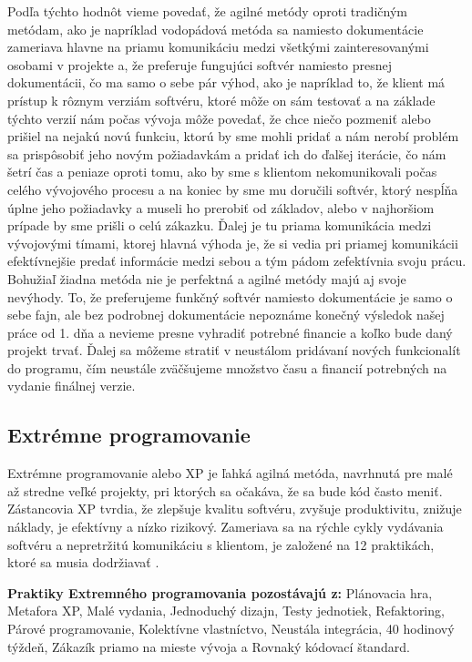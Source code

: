 \documentclass[10pt,oneside,slovak,a4paper]{article}
\begin{document}
Podľa týchto hodnôt vieme povedať, že agilné metódy oproti tradičným metódam, ako je napríklad vodopádová metóda sa namiesto dokumentácie zameriava hlavne na priamu komunikáciu medzi všetkými zainteresovanými osobami v projekte a, že preferuje fungujúci softvér namiesto presnej dokumentácii, čo ma samo o sebe pár výhod, ako je napríklad to, že klient má prístup k rôznym verziám softvéru, ktoré môže on sám testovať a na základe týchto verzií nám počas vývoja môže povedať, že chce niečo pozmeniť alebo prišiel na nejakú novú funkciu, ktorú by sme mohli pridať a nám nerobí problém sa prispôsobiť jeho novým požiadavkám a pridať ich do ďalšej iterácie, čo nám šetrí čas a peniaze oproti tomu, ako by sme s klientom nekomunikovali počas celého vývojového procesu a na koniec by sme mu doručili softvér, ktorý nespĺňa úplne jeho požiadavky a museli ho prerobiť od základov, alebo v najhoršiom prípade by sme prišli o celú zákazku. Ďalej je tu priama komunikácia medzi vývojovými tímami, ktorej hlavná výhoda je, že si vedia pri priamej komunikácii efektívnejšie predať informácie medzi sebou a tým pádom zefektívnia svoju prácu. Bohužiaľ žiadna metóda nie je perfektná a agilné metódy majú aj svoje nevýhody. To, že preferujeme funkčný softvér namiesto dokumentácie je samo o sebe fajn, ale bez podrobnej dokumentácie nepoznáme konečný výsledok našej práce od 1. dňa a nevieme presne vyhradiť potrebné financie a koľko bude daný projekt trvať. Ďalej sa môžeme stratiť v neustálom pridávaní nových funkcionalít do programu, čím neustále zväčšujeme množstvo času a financií potrebných na vydanie finálnej verzie.


\subsection{Extrémne programovanie}\label{XP}
Extrémne programovanie alebo XP je ľahká agilná metóda, navrhnutá pre malé až stredne veľké projekty, pri ktorých sa očakáva, že sa bude kód často meniť. Zástancovia XP tvrdia, že zlepšuje kvalitu softvéru, zvyšuje produktivitu, znižuje náklady, je efektívny a nízko rizikový. Zameriava sa na rýchle cykly vydávania softvéru a nepretržitú komunikáciu s klientom, je založené na 12 praktikách, ktoré sa musia dodržiavať \cite{1008537}.

\textbf{Praktiky Extremného programovania pozostávajú z:}
Plánovacia hra,  Metafora XP,  Malé vydania, Jednoduchý dizajn, Testy jednotiek,  Refaktoring,  Párové programovanie, Kolektívne vlastníctvo,  Neustála integrácia, 40 hodinový týždeň, Zákazík priamo na mieste vývoja a Rovnaký kódovací štandard.\cite{1008537}\\
\end{document}
